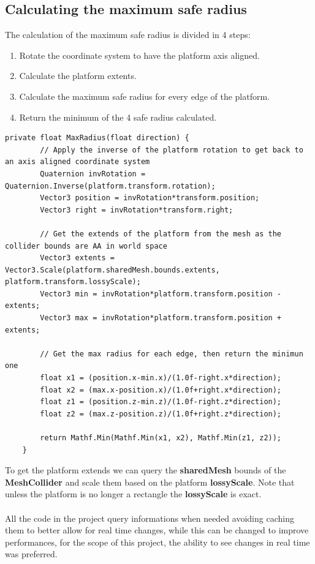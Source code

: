 \documentclass[12pt, a4paper]{article}
\begin{document}
\subsection{Calculating the maximum safe radius}
The calculation of the maximum safe radius is divided in 4 steps:
\begin{enumerate}
\item Rotate the coordinate system to have the platform axis aligned.
\item Calculate the platform extents.
\item Calculate the maximum safe radius for every edge of the platform.
\item Return the minimum of the 4 safe radius calculated.
\end{enumerate}
\begin{lstlisting}[caption={MaxRadius}]
    private float MaxRadius(float direction) {
        // Apply the inverse of the platform rotation to get back to an axis aligned coordinate system
        Quaternion invRotation = Quaternion.Inverse(platform.transform.rotation);
        Vector3 position = invRotation*transform.position;
        Vector3 right = invRotation*transform.right;

        // Get the extends of the platform from the mesh as the collider bounds are AA in world space
        Vector3 extents = Vector3.Scale(platform.sharedMesh.bounds.extents, platform.transform.lossyScale);
        Vector3 min = invRotation*platform.transform.position - extents;
        Vector3 max = invRotation*platform.transform.position + extents;

        // Get the max radius for each edge, then return the minimun one
        float x1 = (position.x-min.x)/(1.0f-right.x*direction);
        float x2 = (max.x-position.x)/(1.0f+right.x*direction);
        float z1 = (position.z-min.z)/(1.0f-right.z*direction);
        float z2 = (max.z-position.z)/(1.0f+right.z*direction);

        return Mathf.Min(Mathf.Min(x1, x2), Mathf.Min(z1, z2));
    }
\end{lstlisting}
To get the platform extends we can query the \textbf{sharedMesh} bounds of the \textbf{MeshCollider} and scale them based on the platform \textbf{lossyScale}.
Note that unless the platform is no longer a rectangle the \textbf{lossyScale} is exact.\\\\
All the code in the project query informations when needed avoiding caching them to better allow for real time changes, while this can be changed to improve performances, for the scope of this project, the ability to see changes in real time was preferred.
\end{document}
